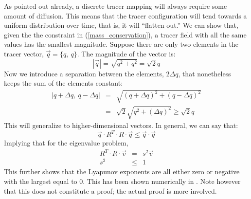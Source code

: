 \documentclass[11pt]{article}
\begin{document}
As pointed out already, a discrete tracer mapping will always require some 
amount of diffusion.  This means that the tracer configuration will 
tend towards a uniform distribution over time, 
that is, it will ``flatten out.''  We can
show that, given the the constraint in (\ref{mass_conservation}), 
a tracer field with all the same values
 has the smallest magnitude.  Suppose there are only two elements in the 
tracer vector, $\vec q=\lbrace q,~q \rbrace$.  The magnitude of the vector is:
\begin{equation}
|\vec q|=\sqrt{q^2+q^2}=\sqrt{2} q
\end{equation}
Now we introduce a separation between the elements, $2\Delta q$, that 
nonetheless keeps the sum of the elements constant:
\begin{eqnarray}
|q+\Delta q,~q-\Delta q| & = & \sqrt{(q+\Delta q)^2+(q-\Delta q)^2} \\
& = & \sqrt{2}\sqrt{q^2+(\Delta q)^2} \ge \sqrt{2} q
\end{eqnarray}
This will generalize to higher-dimensional vectors.  In general, we can
say that:
\begin{equation}
\vec q \cdot R^T \cdot R \cdot \vec q \le \vec q \cdot \vec q
\label{tracer_map_inequality}
\end{equation}
Implying that for the eigenvalue problem,
\begin{eqnarray}
R^T \cdot R \cdot \vec v & = & s^2 \vec v \nonumber\\
s^2 & \le & 1 \label{SV_inequality}
\end{eqnarray}
This further shows that the Lyapunov exponents are all
either zero or negative with the largest equal to 0.  This has been shown
numerically in \citet{Mills2012}.
Note however that this does not constitute a proof; the actual proof is more 
involved.
\end{document}
